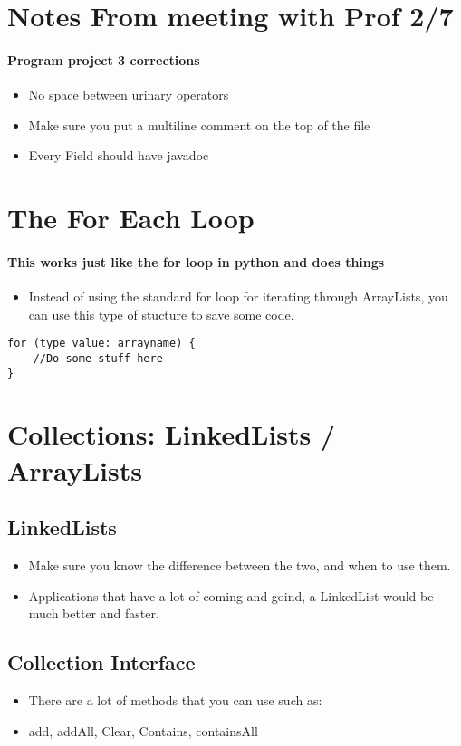 \documentclass{article}
\begin{document}
\section{Notes From meeting with Prof 2/7}

\paragraph{Program project 3 corrections}

\begin{itemize}
  \item No space between urinary operators 
  \item Make sure you put a multiline comment on the top of the file
  \item Every Field should have javadoc 
\end{itemize}

\section{The For Each Loop}
\paragraph{This works just like the for loop in python and does things}

\begin{itemize}
  \item Instead of using the standard for loop for iterating through ArrayLists, you can use this type of stucture to save some code.
\end{itemize}

\begin{lstlisting}
for (type value: arrayname) {
	//Do some stuff here 
}
\end{lstlisting}

\section{Collections: LinkedLists / ArrayLists}
\subsection{LinkedLists}

\begin{itemize}
  \item Make sure you know the difference between the two, and when to use them.
  \item Applications that have a lot of coming and goind, a LinkedList would be much better and faster.
\end{itemize}

\subsection{Collection Interface}

\begin{itemize}
  \item There are a lot of methods that you can use such as:
  \item add, addAll, Clear, Contains, containsAll
\end{itemize}
\end{document}
